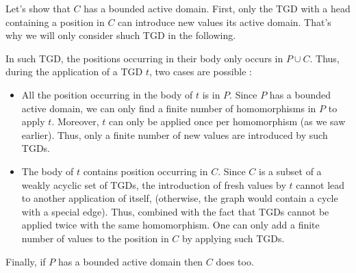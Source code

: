 \documentclass{../../cs-classes/cs-classes}
\begin{document}
\begin{exercise}

    Let's show that $C$ has a bounded active domain. First, only the TGD with a
    head containing a position in $C$ can introduce new values its active domain.
    That's why we will only consider shuch TGD in the following.

    In such TGD, the positions occurring in their body only occurs in $P \cup C$.
    Thus, during the application of a TGD $t$, two cases are possible :
    \begin{itemize}
        \item All the position occurring in the body of $t$ is in $P$. Since $P$
              has a bounded active domain, we can only find a finite number of
              homomorphisms in $P$ to apply $t$. Moreover, $t$ can only be
              applied once per homomorphism (as we saw earlier). Thus, only a
              finite number of new values are introduced by such TGDs.
        \item The body of $t$ contains position occurring in $C$. Since $C$ is
              a subset of a weakly acyclic set of TGDs, the introduction of
              fresh values by $t$ cannot lead to another application of
              itself, (otherwise, the graph would contain a cycle with a special
              edge). Thus, combined with the fact that TGDs cannot be applied
              twice with the same homomorphism. One can only add a finite number
              of values to the position in $C$ by applying such TGDs.
    \end{itemize}
    Finally, if $P$ has a bounded active domain then $C$ does too.
\end{exercise}
\end{document}
